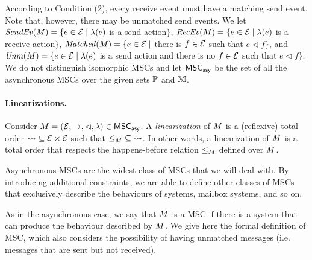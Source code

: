 According to Condition (2), every receive event must have a matching send event. Note that, however, there may be unmatched send events.
We let
$\mathit{SendEv}(M) = \{e \in \mathcal{E} \mid \lambda(e)$ is a send
action$\}$,
$\mathit{RecEv}(M) = \{e \in \mathcal{E} \mid \lambda(e)$ is a receive
action$\}$,
$\mathit{Matched}(M) = \{e \in \mathcal{E} \mid$ there is $f \in \mathcal{E}$
such that $e \lhd f\}$, and
$\mathit{Unm}(M) = \{e \in \mathcal{E} \mid \lambda(e)$ is a send
action and there is no $f \in \mathcal{E}$ such that $e \lhd f\}$.
%
We do not distinguish isomorphic MSCs and
let $\mathsf{MSC}_{\mathsf{asy}}$ be the set of all the asynchronous MSCs over the given sets $\mathbb{P}$ and $\mathbb{M}$.



\paragraph*{Linearizations.}

Consider $M = (\mathcal{E},\to,\lhd,\lambda) \in \mathsf{MSC}_{\mathsf{asy}}$.
A \emph{linearization} of $M$ is a (reflexive) total order ${\rightsquigarrow} \subseteq \mathcal{E} \times \mathcal{E}$ such that ${\le_M} \subseteq {\rightsquigarrow}$. In other words, a linearization of $M$ is a total order that respects the happens-before relation $\le_M$ defined over $M$.

\medskip

Asynchronous MSCs are the widest class of MSCs that we will deal with. By introducing additional constraints, we are able to define other classes of MSCs that exclusively describe the behaviours of \pp systems, mailbox systems, and so on.

As in the asynchronous case, we say that $M$ is a \pp MSC if there is a \pp system that can produce the behaviour described by $M$. We give here the formal definition of \pp MSC, which also considers the possibility of having unmatched messages (i.e. messages that are sent but not received).

